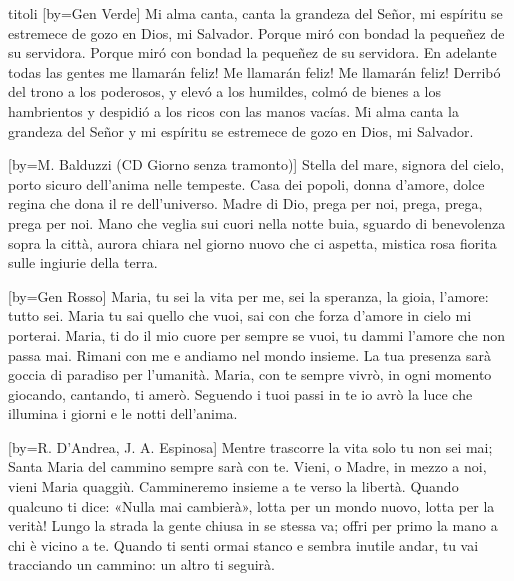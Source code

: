 \begin{songs}{titoli}
[by={Gen Verde}]
\beginchorus
Mi alma canta, canta la grandeza del Señor,
mi espíritu se estremece de gozo en Dios,
mi Salvador.
\endchorus
\beginverse
Porque miró con bondad
la pequeñez de su servidora.
Porque miró con bondad
la pequeñez de su servidora.
En adelante todas las gentes
me llamarán feliz!
Me llamarán feliz!
Me llamarán feliz!
\endverse
\beginverse
Derribó del trono a los poderosos,
y elevó a los humildes,
colmó de bienes a los hambrientos
y despidió a los ricos con las manos vacías.
Mi alma canta la grandeza del Señor
y mi espíritu se estremece
de gozo en Dios, mi Salvador.
\endverse
\endsong

[by={M. Balduzzi (CD Giorno senza tramonto)}]
\beginverse
Stella del mare, signora del cielo,
porto sicuro dell'anima nelle tempeste.
Casa dei popoli, donna d'amore,
dolce regina che dona il re dell'universo.
\endverse
\beginchorus
Madre di Dio, prega per noi,
prega, prega, prega per noi.
\endchorus
\beginverse
Mano che veglia sui cuori nella notte buia,
sguardo di benevolenza sopra la città,
aurora chiara nel giorno nuovo che ci aspetta,
mistica rosa fiorita sulle ingiurie della terra.
\endverse
\endsong

[by={Gen Rosso}]
\beginverse
Maria, tu sei la vita per me,
sei la speranza, la gioia, l'amore: tutto sei.
Maria tu sai quello che vuoi,
sai con che forza d'amore in cielo mi porterai.
\endverse
\beginchorus
Maria, ti do il mio cuore per sempre se vuoi,
tu dammi l'amore che non passa mai.
Rimani con me e andiamo nel mondo insieme.
La tua presenza sarà goccia di paradiso per l'umanità.
\endchorus
\beginverse
Maria, con te sempre vivrò,
in ogni momento giocando, cantando, ti amerò.
Seguendo i tuoi passi in te io avrò
la luce che illumina i giorni e le notti dell'anima.
\endverse
\endsong

[by={R. D'Andrea, J. A. Espinosa}]
\beginverse
Mentre trascorre la vita
solo tu non sei mai;
Santa Maria del cammino
sempre sarà con te.
\endverse
\beginchorus
Vieni, o Madre, in mezzo a noi, vieni Maria quaggiù.
Cammineremo insieme a te
verso la libertà.
\endchorus
\beginverse
Quando qualcuno ti dice:
«Nulla mai cambierà»,
lotta per un mondo nuovo,
lotta per la verità!
\endverse
\beginverse
Lungo la strada la gente
chiusa in se stessa va;
offri per primo la mano
a chi è vicino a te.
\endverse
\beginverse
Quando ti senti ormai stanco
e sembra inutile andar,
tu vai tracciando un cammino:
un altro ti seguirà.
\endverse
\endsong

\end{songs}
